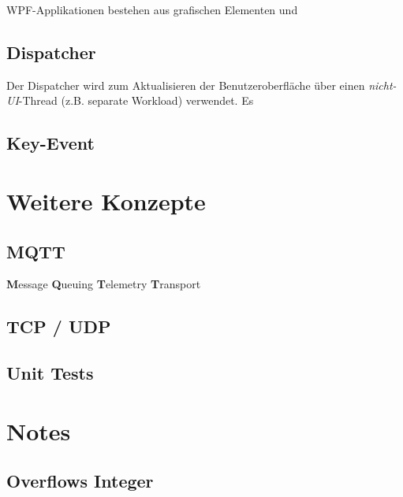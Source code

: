 \documentclass[
  9pt,
  a4paperpaper,
  DIV=11]{scrartcl}
\numberwithin{equation}{section}
\begin{document}
\begin{multicols}{2}
\begin{tcolorbox}
WPF-Applikationen bestehen aus grafischen Elementen und

\end{tcolorbox}

\hypertarget{dispatcher}{%
\subsection{Dispatcher}\label{dispatcher}}

Der Dispatcher wird zum Aktualisieren der Benutzeroberfläche über einen
\emph{nicht-UI}-Thread (z.B. separate Workload) verwendet. Es

\hypertarget{key-event}{%
\subsection{Key-Event}\label{key-event}}

\hypertarget{weitere-konzepte}{%
\section{Weitere Konzepte}\label{weitere-konzepte}}

\hypertarget{mqtt}{%
\subsection{MQTT}\label{mqtt}}

\textbf{M}essage \textbf{Q}ueuing \textbf{T}elemetry \textbf{T}ransport

\hypertarget{tcp-udp}{%
\subsection{TCP / UDP}\label{tcp-udp}}

\hypertarget{unit-tests}{%
\subsection{Unit Tests}\label{unit-tests}}

\hypertarget{notes}{%
\section{Notes}\label{notes}}

\hypertarget{overflows-integer}{%
\subsection{Overflows Integer}\label{overflows-integer}}


\end{multicols}
\end{document}
